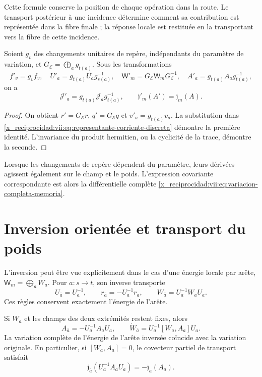 Cette formule conserve la position de chaque opération dans la route.
Le transport postérieur à une incidence détermine comment sa contribution
est représentée dans la fibre finale ; la réponse locale est restituée
en la transportant vers la fibre de cette incidence.

\begin{proposition}
\label{x_reciprocidad:vii:prop:covariancia-corriente-memoria}
Soient \(g_v\) des changements unitaires de repère, indépendants du paramètre
de variation, et \(G_{\mathcal E}=\bigoplus_a g_{t(a)}\).
Sous les transformations
\[
 f'_v=g_vf_v,\quad U'_a=g_{t(a)}U_ag_{s(a)}^{-1},\quad
 \mathsf W'_m=G_{\mathcal E}\mathsf W_mG_{\mathcal E}^{-1},\quad
 A'_a=g_{t(a)}A_ag_{t(a)}^{-1},
\]
on a
\begin{equation}
 \mathcal J'_a=g_{t(a)}\mathcal J_ag_{t(a)}^{-1},
 \qquad \mathfrak j'_m(A')=\mathfrak j_m(A).
 \label{x_reciprocidad:vii:eq:covariancia-respuesta}
\end{equation}
\end{proposition}

\begin{proof}
On obtient \(r'=G_{\mathcal E}r\), \(q'=G_{\mathcal E}q\) et \(v'_a=g_{t(a)}v_a\). La substitution dans \eqref{x_reciprocidad:vii:eq:representante-corriente-discreta} démontre la première identité. L'invariance du produit hermitien, ou la cyclicité de la trace, démontre la seconde.
\end{proof}

Lorsque les changements de repère dépendent du paramètre, leurs dérivées
agissent également sur le champ et le poids. L'expression covariante
correspondante est alors la différentielle complète
\eqref{x_reciprocidad:vii:eq:variacion-completa-memoria}.

\section{Inversion orientée et transport du poids}
\label{x_reciprocidad:vii:subsec:inversion-respuesta}

L'inversion peut être vue explicitement dans le cas d'une énergie locale par arête, \(\mathsf W_m=\bigoplus_a W_a\). Pour \(a:s\to t\), son inverse transporte
\[
 U_{\bar a}=U_a^{-1},\qquad
 r_{\bar a}=-U_a^{-1}r_a,\qquad
 W_{\bar a}=U_a^{-1}W_aU_a.
\]
Ces règles conservent exactement l'énergie de l'arête.

\begin{proposition}
\label{x_reciprocidad:vii:prop:inversion-respuesta}
Si \(W_a\) et les champs des deux extrémités restent fixes, alors
\[
 A_{\bar a}=-U_a^{-1}A_aU_a,\qquad
 \dot W_{\bar a}=U_a^{-1}[W_a,A_a]U_a.
\]
La variation complète de l'énergie de l'arête inversée coïncide avec
la variation originale. En particulier, si \([W_a,A_a]=0\), le covecteur partiel
de transport satisfait
\begin{equation}
 \mathfrak j_{\bar a}(U_a^{-1}A_aU_a)
 =-\mathfrak j_a(A_a).
 \label{x_reciprocidad:vii:eq:imparidad-transporte}
\end{equation}
\end{proposition}

